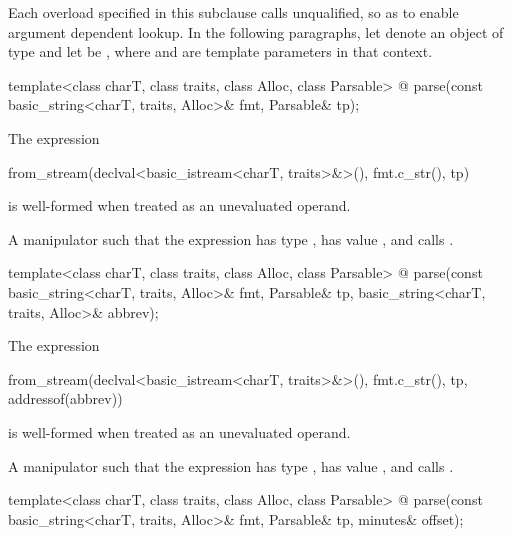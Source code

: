 \pnum
Each  overload specified in this subclause
calls  unqualified,
so as to enable argument dependent lookup.
In the following paragraphs,
let  denote an object of type  and
let  be ,
where  and  are template parameters in that context.

\begin{itemdecl}
template<class charT, class traits, class Alloc, class Parsable>
  @\unspec@
    parse(const basic_string<charT, traits, Alloc>& fmt, Parsable& tp);
\end{itemdecl}

\begin{itemdescr}
\pnum
\constraints
The expression
\begin{codeblock}
from_stream(declval<basic_istream<charT, traits>&>(), fmt.c_str(), tp)
\end{codeblock}
is well-formed when treated as an unevaluated operand.

\pnum
\returns
A manipulator such that
the expression 
has type ,
has value , and
calls .
\end{itemdescr}

\begin{itemdecl}
template<class charT, class traits, class Alloc, class Parsable>
  @\unspec@
    parse(const basic_string<charT, traits, Alloc>& fmt, Parsable& tp,
          basic_string<charT, traits, Alloc>& abbrev);
\end{itemdecl}

\begin{itemdescr}
\pnum
\constraints
The expression
\begin{codeblock}
from_stream(declval<basic_istream<charT, traits>&>(), fmt.c_str(), tp, addressof(abbrev))
\end{codeblock}
is well-formed when treated as an unevaluated operand.

\pnum
\returns
A manipulator such that
the expression 
has type , 
has value , and
calls .
\end{itemdescr}

\begin{itemdecl}
template<class charT, class traits, class Alloc, class Parsable>
  @\unspec@
    parse(const basic_string<charT, traits, Alloc>& fmt, Parsable& tp,
          minutes& offset);
\end{itemdecl}

